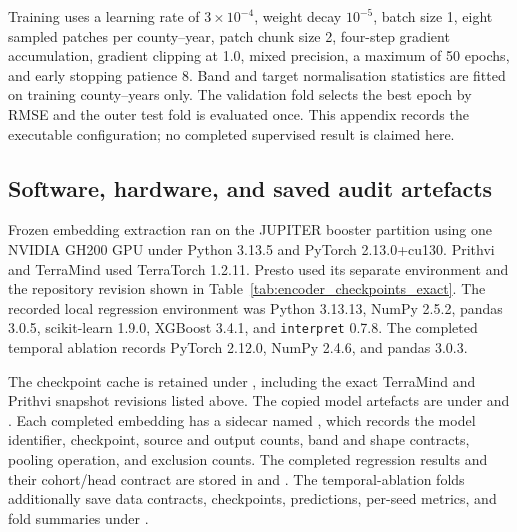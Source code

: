 Training uses a learning rate of $3\times10^{-4}$, weight decay $10^{-5}$,
batch size 1, eight sampled patches per county--year, patch chunk size 2,
four-step gradient accumulation, gradient clipping at 1.0, mixed precision, a
maximum of 50 epochs, and early stopping patience 8.  Band and target
normalisation statistics are fitted on training county--years only.  The
validation fold selects the best epoch by RMSE and the outer test fold is
evaluated once.  This appendix records the executable configuration; no
completed supervised result is claimed here.

\subsection{Software, hardware, and saved audit artefacts}

Frozen embedding extraction ran on the JUPITER booster partition using one
NVIDIA GH200 GPU under Python 3.13.5 and PyTorch 2.13.0+cu130.  Prithvi and
TerraMind used TerraTorch 1.2.11.  Presto used its separate environment and the
repository revision shown in Table~\ref{tab:encoder_checkpoints_exact}.  The
recorded local regression environment was Python 3.13.13, NumPy 2.5.2, pandas
3.0.5, scikit-learn 1.9.0, XGBoost 3.4.1, and \texttt{interpret} 0.7.8.  The
completed temporal ablation records PyTorch 2.12.0, NumPy 2.4.6, and pandas
3.0.3.

The checkpoint cache is retained under , including the exact
TerraMind and Prithvi snapshot revisions listed above.  The copied model
artefacts are under  and .  Each completed embedding
has a sidecar named , which
records the model identifier, checkpoint, source and output counts, band and
shape contracts, pooling operation, and exclusion counts.  The completed
regression results and their cohort/head contract are stored in
 and
.  The temporal-ablation
folds additionally save data contracts, checkpoints, predictions, per-seed
metrics, and fold summaries under .
